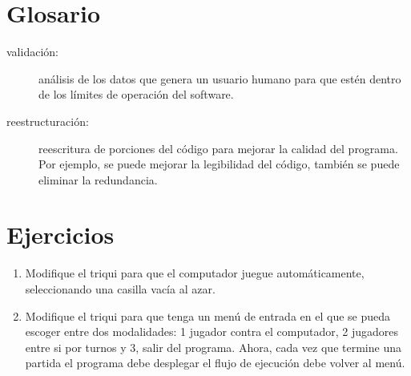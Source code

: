 \section{Glosario}

\begin{description}

\item[validación:] análisis de los datos que genera un usuario humano para que estén dentro
de los límites de operación del software.

\item[reestructuración:] reescritura de porciones del código para mejorar la calidad del programa. 
Por ejemplo, se puede mejorar la legibilidad del código, también se puede eliminar la redundancia.


\end{description}

\section{Ejercicios}

\begin{enumerate}

\item Modifique el triqui para que el computador juegue automáticamente, seleccionando
una casilla vacía al azar. 

\item Modifique el triqui para que tenga un menú de entrada en el que se pueda
escoger entre dos modalidades: 1 jugador contra el computador, 2 jugadores entre si
por turnos y 3, salir del programa. Ahora, cada vez que termine una partida el programa debe desplegar 
el flujo de ejecución debe volver al menú.

\end{enumerate}

